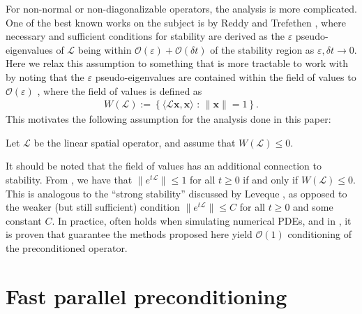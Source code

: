 \documentclass[review]{siamart}
\begin{document}
For non-normal or non-diagonalizable operators, the analysis is more complicated.
One of the best known works on the subject is by Reddy and Trefethen \cite{reddy92},
where necessary and sufficient conditions for stability are derived as the
$\varepsilon$ pseudo-eigenvalues of $\mathcal{L}$ being within
$\mathcal{O}(\varepsilon) + \mathcal{O}(\delta t)$ of the stability region
as $\varepsilon,\delta t\to 0$. Here we relax this assumption to something
that is more tractable to work with by noting that the $\varepsilon$
pseudo-eigenvalues are contained within the field of values to
$\mathcal{O}(\varepsilon)$ \cite[Eq. (17.9)]{trefethen2005spectra},
where the field of values is defined as
%
\begin{align}\label{eq:fov}
W(\mathcal{L}) := \left\{ \langle \mathcal{L}\mathbf{x},\mathbf{x}\rangle \text{ : }
	\|\mathbf{x}\| = 1 \right\}.
\end{align}
%
This motivates the following assumption for the analysis done in this paper:
%
\begin{assumption} \label{ass:fov}
Let $\mathcal{L}$ be the linear spatial operator, and assume that $W(\mathcal{L}) \leq 0$.
\end{assumption}
%
It should be noted that the field of values has an additional connection
to stability. From \cite[Theorem 17.1]{trefethen2005spectra}, we have that
$\|e^{t\mathcal{L}}\|\leq 1$ for all $t\geq 0$ if and only if $W(\mathcal{L}) \leq 0$.
This is analogous to the ``strong stability'' discussed by Leveque
\cite[Chapter 9.5]{leveque2007finite}, as opposed to the weaker (but still
sufficient) condition $\|e^{t\mathcal{L}}\|\leq C$ for all $t\geq 0$ and
some constant $C$. In practice,  often holds when
simulating numerical PDEs, and in , it is proven that
 guarantee the methods proposed here yield
$\mathcal{O}(1)$ conditioning of the preconditioned operator.

\section{Fast parallel preconditioning}\label{sec:solve}
\end{document}
